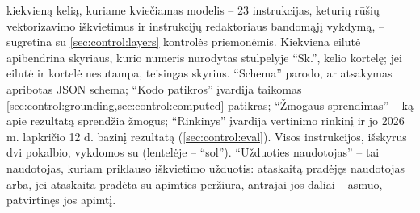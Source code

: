  kiekvieną kelią, kuriame kviečiamas modelis -- 23 instrukcijas,
keturių rūšių vektorizavimo iškvietimus ir instrukcijų redaktoriaus bandomąjį vykdymą, --
sugretina su \cref{sec:control:layers} kontrolės priemonėmis. Kiekviena eilutė apibendrina
skyriaus, kurio numeris nurodytas stulpelyje \enquote{Sk.}, kelio kortelę; jei eilutė ir kortelė nesutampa,
teisingas skyrius. \enquote{Schema} parodo, ar atsakymas apribotas JSON schema; \enquote{Kodo
patikros} įvardija taikomas \cref{sec:control:grounding,sec:control:computed} patikras;
\enquote{Žmogaus sprendimas} -- ką apie rezultatą sprendžia žmogus; \enquote{Rinkinys}
įvardija vertinimo rinkinį ir jo 2026 m. lapkričio 12 d. bazinį rezultatą
(\cref{sec:control:eval}). Visos instrukcijos, išskyrus dvi pokalbio, vykdomos su
 (lentelėje -- \enquote{sol}). \enquote{Užduoties naudotojas} -- tai
naudotojas, kuriam priklauso iškvietimo užduotis: ataskaitą pradėjęs naudotojas arba, jei
ataskaita pradėta su apimties peržiūra, antrajai jos daliai -- asmuo, patvirtinęs jos
apimtį.

